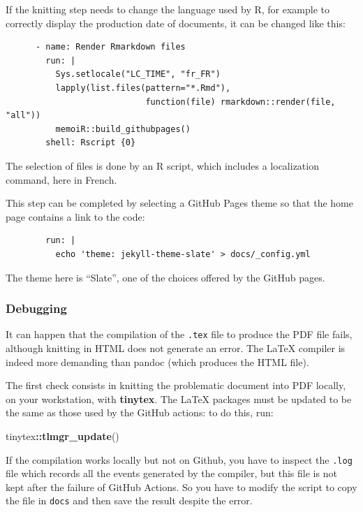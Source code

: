 \documentclass[
  12pt,
  american,
  a4paper,
  extrafontsizes,onecolumn,openright
  ]{memoir}
\newenvironment{Shaded}{\begin{snugshade}}{\end{snugshade}}
\newcommand{\FunctionTok}[1]{\textcolor[rgb]{0.13,0.29,0.53}{\textbf{#1}}}
\newcommand{\NormalTok}[1]{#1}
\newcommand{\SpecialCharTok}[1]{\textcolor[rgb]{0.81,0.36,0.00}{\textbf{#1}}}
\begin{document}
If the knitting step needs to change the language used by R, for example to correctly display the production date of documents, it can be changed like this:

\begin{verbatim}
      - name: Render Rmarkdown files
        run: |
          Sys.setlocale("LC_TIME", "fr_FR")
          lapply(list.files(pattern="*.Rmd"), 
                            function(file) rmarkdown::render(file, "all"))
          memoiR::build_githubpages()
        shell: Rscript {0}
\end{verbatim}

The selection of files is done by an R script, which includes a localization command, here in French.

This step can be completed by selecting a GitHub Pages theme so that the home page contains a link to the code:

\begin{verbatim}
        run: |
          echo 'theme: jekyll-theme-slate' > docs/_config.yml
\end{verbatim}

The theme here is \enquote{Slate}, one of the choices offered by the GitHub pages.

\subsubsection{Debugging}\label{debugging}

It can happen that the compilation of the \texttt{.tex} file to produce the PDF file fails, although knitting in HTML does not generate an error.
The LaTeX compiler is indeed more demanding than pandoc (which produces the HTML file).

The first check consists in knitting the problematic document into PDF locally, on your workstation, with \textbf{tinytex}.
The LaTeX packages must be updated to be the same as those used by the GitHub actions: to do this, run:

\scriptsize

\begin{Shaded}
\begin{Highlighting}[]
\NormalTok{tinytex}\SpecialCharTok{::}\FunctionTok{tlmgr\_update}\NormalTok{()}
\end{Highlighting}
\end{Shaded}

\normalsize

If the compilation works locally but not on Github, you have to inspect the \texttt{.log} file which records all the events generated by the compiler, but this file is not kept after the failure of GitHub Actions.
So you have to modify the script to copy the file in \texttt{docs} and then save the result despite the error.
\end{document}
